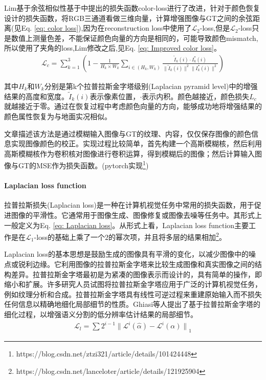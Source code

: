 \documentclass[letterpaper,12pt]{article}
\begin{document}
	Lim\cite{9264763}基于余弦相似性基于\cite{8953588}中提出的损失函数color-loss进行了改进，针对于颜色恢复设计的损失函数，将RGB三通道看做三维向量，计算增强图像与GT之间的余弦距离(见Eq. \ref{eq: color loss}),因为在reconstruction loss中使用了$\mathcal{L}_2$-loss,但是$\mathcal{L}_2$-loss只是数值上测量色差，不能保证颜色向量的方向是相同的，可能导致颜色mismatch,所以使用了夹角的loss,Lim\cite{9264763}修改之后,见Eq. \ref{eq: Improved color loss}。
	\begin{equation}
		\begin{aligned}
			\mathcal{L}_c = \sum_{k=1}^{3} \left( 1- \frac{1}{H_k \times W_k} \sum_{i \in (H_k, W_k)} \frac{\tilde{I}_k(i) \cdot I_k^{*}(i)}{{\| \tilde{I}_k(i) \|^2} {\| I_k^{*}(i) \|^2}} \right)
		\end{aligned}
		\label{eq: Improved color loss}
	\end{equation}
	
	其中$H_k$和$W_k$分别是第k个拉普拉斯金字塔级别(Laplacian pyramid level)中的增强结果的高度和宽度。$\tilde{I}_k(i)$表示像素位置，$\cdot$表示内积。颜色越接近，颜色损失$L_c$就越接近于零。通过在恢复过程中考虑颜色向量的方向，能够成功地将增强结果的颜色属性恢复为与地面实况相似。
	
	文章描述该方法是通过模糊输入图像与GT的纹理、内容，仅仅保存图像的颜色信息实现图像颜色的校正。实现过程比较简单，首先构建一个高斯模糊核，然后利用高斯模糊核作为卷积核对图像进行卷积运算，得到模糊后的图像；然后计算输入图像与GT的MSE作为损失函数。(pytorch实现\footnote{https://blog.csdn.net/ztzi321/article/details/101424448})

	
	\paragraph{Laplacian loss function}
	
	拉普拉斯损失(Laplacian loss)是一种在计算机视觉任务中常用的损失函数，用于促进图像的平滑性。它通常用于图像生成、图像修复或图像去噪等任务中。其形式上一般定义为Eq. \ref{eq: Laplacian loss}。从形式上看，Laplacian loss function主要工作是在$\mathcal{L}_1$-loss的基础上乘了一个$2$的幂次项，并且将多层的结果相加\footnote{https://blog.csdn.net/lanceloter/article/details/121925904}。
	
	Laplacian loss的基本思想是鼓励生成的图像具有平滑的变化，以减少图像中的噪点或锐利边缘。它利用图像的拉普拉斯金字塔来比较生成图像和真实图像之间的结构差异。拉普拉斯金字塔\cite{burt1987laplacian}最初是为紧凑的图像表示而设计的，具有简单的操作，即缩小和扩展。许多研究人员试图将拉普拉斯金字塔应用于广泛的计算机视觉任务，例如纹理分析和合成。拉普拉斯金字塔具有线性可逆过程来重建原始输入而不损失任何信息以精确地细化局部细节的性质。Ghiasi等人\cite{ghiasi2016laplacian}提出了基于拉普拉斯金字塔的细化过程，以增强语义分割的低分辨率估计结果的局部细节。
	\begin{equation}
		\begin{aligned}
			\mathcal{L}_l = \sum 2^{i-1} {\| \mathcal{L}^i(\hat{\alpha}) - \mathcal{L}^i(\alpha) \|}_1 
		\end{aligned}
		\label{eq: Laplacian loss}
	\end{equation}
	
\end{document}
